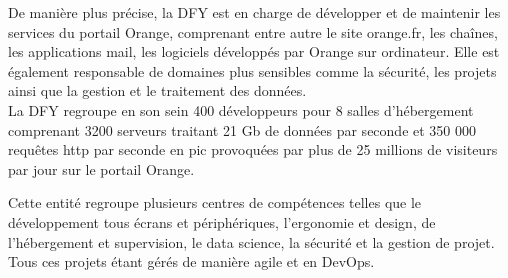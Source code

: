 De manière plus précise, la DFY est en charge de développer et de maintenir les services du portail Orange, comprenant entre autre le site orange.fr, les chaînes, les applications mail,  les logiciels développés par Orange sur ordinateur.
Elle est également responsable de domaines plus sensibles comme la sécurité, les projets ainsi que la gestion et le traitement des données.\\

La DFY regroupe en son sein 400 développeurs pour 8 salles d’hébergement comprenant 3200 serveurs traitant 21 Gb de données par seconde et 350 000 requêtes http par seconde en pic provoquées par plus de 25 millions de visiteurs par jour sur le portail Orange.

Cette entité regroupe plusieurs centres de compétences telles que le développement tous écrans et périphériques, l'ergonomie et design, de l'hébergement et supervision, le data science, la sécurité et la gestion de projet. Tous ces projets étant gérés de manière agile et en DevOps. 

